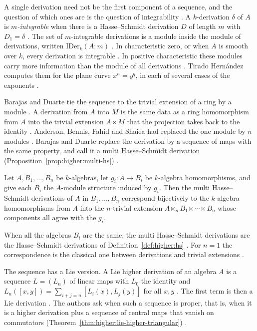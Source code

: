 A single derivation need not be the first component of a sequence, and the
question of which ones are is the question of integrability
\cite[p.~1]{Tirado2021}. A $k$-derivation $\delta$ of $A$ is \emph{$m$-integrable}
when there is a Hasse--Schmidt derivation $D$ of length $m$ with $D_{1}=\delta$
\cite[p.~1]{Tirado2021}. The set of $m$-integrable derivations is a module inside
the module of derivations, written $\mathrm{IDer}_{k}(A;m)$
\cite[p.~1]{Tirado2021}. In characteristic zero, or when $A$ is smooth over $k$,
every derivation is integrable \cite[p.~1]{Tirado2021}. In positive characteristic
these modules carry more information than the module of all derivations
\cite[p.~1]{Tirado2021}. Tirado Hern\'andez computes them for the plane curve
$x^{n}=y^{q}$, in each of several cases of the exponents
\cite[Proposition~2.1, p.~4]{Tirado2021}.

Barajas and Duarte tie the sequence to the trivial extension of a ring by a module
\cite[p.~2]{BarajasDuarte2026}. A derivation from $A$ into $M$ is the same data as a
ring homomorphism from $A$ into the trivial extension $A\ltimes M$ that the
projection takes back to the identity \cite[p.~2]{BarajasDuarte2026}. Anderson,
Bennis, Fahid and Shaiea had replaced the one module by $n$ modules
\cite[p.~2]{BarajasDuarte2026}. Barajas and Duarte replace the derivation by a
sequence of maps with the same property, and call it a multi Hasse--Schmidt
derivation (Proposition~\ref{prop:higher:multi-hs}) \cite[Definition~3.1, p.~6]{BarajasDuarte2026}.

\begin{proposition}\label{prop:higher:multi-hs}
Let $A,B_{1},\dots,B_{n}$ be $k$-algebras, let $g_{i}\colon A\to B_{i}$ be $k$-algebra
homomorphisms, and give each $B_{i}$ the $A$-module structure induced by $g_{i}$.
Then the multi Hasse--Schmidt derivations of $A$ in $B_{1},\dots,B_{n}$ correspond
bijectively to the $k$-algebra homomorphisms from $A$ into the $n$-trivial
extension $A\ltimes_{n}B_{1}\ltimes\cdots\ltimes B_{n}$ whose components all agree
with the $g_{i}$.
\end{proposition}

When all the algebras $B_{i}$ are the same, the multi Hasse--Schmidt derivations
are the Hasse--Schmidt derivations of Definition~\ref{def:higher:hs}
\cite[p.~2]{BarajasDuarte2026}. For $n=1$ the correspondence is the classical one
between derivations and trivial extensions \cite[p.~2]{BarajasDuarte2026}.

The sequence has a Lie version. A Lie higher derivation of an algebra $A$ is a
sequence $L=(L_{n})$ of linear maps with $L_{0}$ the identity and
$L_{n}([x,y])=\sum_{i+j=n}[L_{i}(x),L_{j}(y)]$ for all $x,y$
\cite[p.~1]{AshrafAnsari2021}. The first term is then a Lie derivation
\cite[p.~1]{AshrafAnsari2021}. The authors ask when such a sequence is proper, that
is, when it is a higher derivation plus a sequence of central maps that vanish on
commutators (Theorem~\ref{thm:higher:lie-higher-triangular}) \cite[p.~1]{AshrafAnsari2021}.

